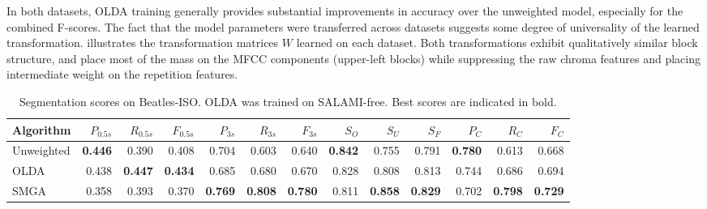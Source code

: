\documentclass{article}
\begin{document}
In both datasets, OLDA training generally provides substantial improvements in accuracy over the unweighted model, 
especially for the combined F-scores.
The fact that the model parameters were transferred across datasets suggests some degree of universality of the
learned transformation.   illustrates the transformation matrices $W$ learned on each dataset. Both
transformations exhibit qualitatively similar block structure, and place most of the mass on the MFCC components
(upper-left blocks) while suppressing the raw chroma features and placing intermediate weight on the repetition
features.



\begin{table}
\centering
\caption{Segmentation scores on Beatles-ISO. OLDA was trained on SALAMI-free. Best scores are
indicated in bold.\label{tab:results:beatles}}
\begin{tabular}{lrrrrrrrrrrrr}
\toprule%
Algorithm   &   $P_{0.5s}$ & $R_{0.5s}$ & $F_{0.5s}$ & $P_{3s}$     & $R_{3s}$  & $F_{3s}$   & $S_O$ & $S_U$ & $S_F$ & $P_C$& $R_C$& $F_C$\\
\hline
Unweighted  &   \textbf{0.446} & 0.390 & 0.408 & 0.704   & 0.603 & 0.640 & \textbf{0.842} & 0.755 & 0.791 & \textbf{0.780} & 0.613 & 0.668\\
OLDA        &   0.438 & \textbf{0.447} & \textbf{0.434} & 0.685   & 0.680 & 0.670 & 0.828 & 0.808 & 0.813 & 0.744 & 0.686 & 0.694\\
\hline
SMGA~\hfill\cite{serra2012unsupervised}
            &   0.358 & 0.393 & 0.370 & \textbf{0.769}   & \textbf{0.808} & \textbf{0.780} & 0.811 & \textbf{0.858} & \textbf{0.829} & 0.702 & \textbf{0.798} &
            \textbf{0.729}\\
\bottomrule%
\end{tabular}
\end{table}
\end{document}
